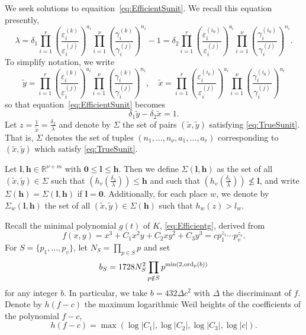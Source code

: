 We seek solutions to equaition~\eqref{eq:EfficientSunit}. We recall this equation presently, 
\begin{equation*}
\lambda = \delta_1 \prod_{i = 1}^r\left( \frac{\varepsilon_i^{(k)}}{\varepsilon_i^{(j)}}\right)^{a_i}\prod_{i = 1}^{\nu} \left( \frac{\gamma_i^{(k)}}{\gamma_i^{(j)}}\right)^{n_i} - 1 = \delta_2 \prod_{i = 1}^{r}\left( \frac{\varepsilon_i^{(i_0)}}{\varepsilon_i^{(j)}}\right)^{a_i} \prod_{i = 1}^{\nu} \left( \frac{\gamma_i^{(i_0)}}{\gamma_i^{(j)}}\right)^{n_i}.
\end{equation*}
To simplify notation, we write
\[\tilde{y} =  \prod_{i = 1}^r\left( \frac{\varepsilon_i^{(k)}}{\varepsilon_i^{(j)}}\right)^{a_i}\prod_{i = 1}^{\nu} \left( \frac{\gamma_i^{(k)}}{\gamma_i^{(j)}}\right)^{n_i}, \quad 
\tilde{x} = \prod_{i = 1}^{r}\left( \frac{\varepsilon_i^{(i_0)}}{\varepsilon_i^{(j)}}\right)^{a_i} \prod_{i = 1}^{\nu} \left( \frac{\gamma_i^{(i_0)}}{\gamma_i^{(j)}}\right)^{n_i}\]
so that equation~\eqref{eq:EfficientSunit} becomes
\begin{equation} \label{eq:TrueSunit}
\delta_1\tilde{y} - \delta_2\tilde{x} = 1.
\end{equation}
Let $z= \frac{1}{\tilde{x}} = \frac{\delta_2}{\lambda}$ and denote by $\Sigma$ the set of pairs $(\tilde{x},\tilde{y})$ satisfying \eqref{eq:TrueSunit}. That is, $\Sigma$ denotes the set of tuples $(n_1, \dots, n_{\nu}, a_1, \dots, a_r)$ corresponding to $(\tilde{x},\tilde{y})$ which satisfy \eqref{eq:TrueSunit}.

Let $\mathbf{l},\mathbf{h}\in\mathbb{R}^{\nu + m}$ with $\mathbf{0}\leq \mathbf{l}\leq \mathbf{h}$. Then we define $\Sigma(\mathbf{l},\mathbf{h})$ as the set of all $(\tilde{x},\tilde{y}) \in \Sigma$ such that $\left(h_v\left(\frac{\delta_2}{\lambda}\right)\right)\leq \mathbf{h}$ and such that $\left(h_v\left(\frac{\delta_2}{\lambda}\right)\right)\nleq \mathbf{l}$, and write $\Sigma(\mathbf{h})=\Sigma(\mathbf{l},\mathbf{h})$ if $\mathbf{l}=\mathbf{0}$. Additionally, for each place $w$, we denote by $\Sigma_w(\mathbf{l},\mathbf{h})$ the set of all $(\tilde{x},\tilde{y})\in\Sigma(\mathbf{h})$ such that $h_w(z)>l_w$. 

Recall the minimal polynomial $g(t)$ of $K$, \eqref{eq:Efficientg}, derived from 
\[f(x,y) = x^3 + C_1 x^{2}y + C_2xy^2 + C_3y^3 = cp_1^{z_1}\cdots p_v^{z_v}.\]
For $S = \{p_1, \dots, p_v\}$, let $N_S = \prod_{p\in S}p$ and set 
\[b_S	 = 1728 N_S^2 \prod_{p \notin S} p^{\min(2,\operatorname{ord}_p(b))}\]
for any integer $b$. In particular, we take $b = 432 \Delta c^2$ with $\Delta$ the discriminant of $f$. Denote by $h(f-c)$ the maximum logarithmic Weil heights of the coefficients of the polynomial $f - c$,
\[h(f-c) = \max(\log|C_1|, \log|C_2|, \log|C_3|, \log|c|).\]

